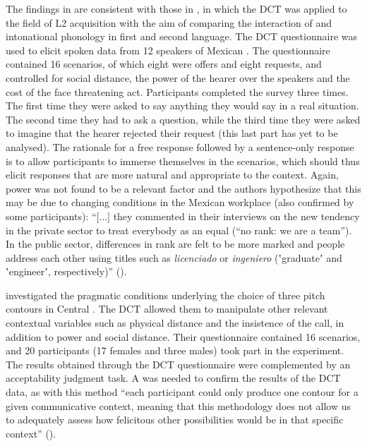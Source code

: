 \documentclass[output=paper]{LSP/langsci}
\begin{document}
The findings in \citet{Astruc2016offers} are consistent with those in \citet{Astruc2016politeness}, in which the DCT was applied to the field of L2 acquisition with the aim of comparing the interaction of  and intonational phonology in first and second language. The DCT questionnaire was used to elicit spoken data from 12 speakers of Mexican . The questionnaire contained 16 scenarios, of which eight were offers and eight requests, and controlled for social distance, the power of the hearer over the speakers and the cost of the face threatening act. Participants completed the survey three times. The first time they were asked to say anything they would say in a real situation. The second time they had to ask a question, while the third time they were asked to imagine that the hearer rejected their request (this last part has yet to be analysed). The rationale for a free response followed by a sentence-only response is to allow participants to immerse themselves in the scenarios, which should thus elicit responses that are more natural and appropriate to the context. Again, power was not found to be a relevant factor and the authors hypothesize that this may be due to changing conditions in the Mexican workplace (also confirmed by some participants): “[...] they commented in their interviews on the new tendency in the private sector to treat everybody as an equal (“no rank: we are a team”). In the public sector, differences in rank are felt to be more marked and people address each other using titles such as \textit{licenciado} or \textit{ingeniero} (ʽgraduateʼ and ʽengineerʼ, respectively)” (\citealt[22]{Astruc2016offers}). 

\citet{Borras-Comes2015} investigated the pragmatic conditions underlying the choice of three  pitch contours in Central . The DCT allowed them to manipulate other relevant contextual variables such as physical distance and the insistence of the call, in addition to power and social distance. Their questionnaire contained 16 scenarios, and 20 participants (17 females and three males) took part in the experiment. The results obtained through the DCT questionnaire were complemented by an acceptability judgment task. A  was needed to confirm the results of the DCT data, as with this method “each participant could only produce one contour for a given communicative context, meaning that this methodology does not allow us to adequately assess how felicitous other possibilities would be in that specific context” (\citealt[74--75]{Borras-Comes2015}).\largerpage[-1]
\end{document}
